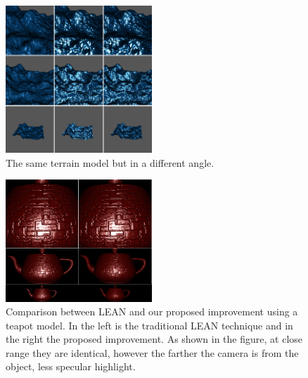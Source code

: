 \documentclass[10pt, conference]{IEEEtran}
\begin{document}
\begin{figure}[h]
	\includegraphics[width=0.49\textwidth]{figs/BLS7.png}
	\caption{The same terrain model but in a different angle.}
	\label{fig:BLS7}
\end{figure}

\begin{figure}[h]
	\includegraphics[width=0.49\textwidth]{figs/LS1.png}
	\caption{Comparison between LEAN and our proposed improvement using a teapot model. In the left is the traditional LEAN technique and in the right the proposed improvement. As shown in the figure, at close range they are identical, however the farther the camera is from the object, less specular highlight.}
	\label{fig:LS1}
\end{figure}

\end{document}
